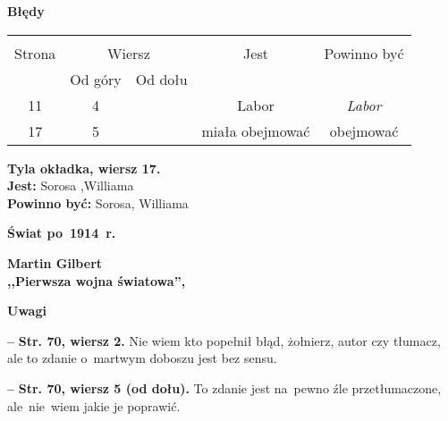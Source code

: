\documentclass[a4paper,11pt]{article}
\newcommand{\spaceTwo}{2em}
\newcommand{\spaceThree}{1em}
\newcommand{\spaceFour}{0.5em}
\newcommand{\tb}{\textbf}
\newcommand{\noi}{\noindent}
\newcommand{\start}{\noi \tb{--} {}}
\newcommand{\Center}[1]{\begin{center} #1 \end{center}}
\newcommand{\CenterTB}[1]{\Center{\tb{#1}}}
\newcommand{\StrWg}[2]{\tb{Str. #1, wiersz #2.}}
\newcommand{\StrWd}[2]{\tb{Str. #1, wiersz #2 (od dołu).}}
\newcommand{\Jest}{\tb{Jest: }}
\newcommand{\Pow}{\tb{Powinno być: }}
\newcommand{\Field}[1]{ \begin{center} {\LARGE \tb{#1} } \end{center} }
\newcommand{\Work}[1]{ \begin{center} {\large \tb{#1}} \end{center} }
\begin{document}
\CenterTB{Błędy}
\begin{center}
  \begin{tabular}{|c|c|c|c|c|}
    \hline
    & \multicolumn{2}{c|}{} & & \\
    Strona & \multicolumn{2}{c|}{Wiersz}& Jest & Powinno być \\ \cline{2-3}
    & Od góry & Od dołu &  &  \\ \hline
    11 & 4 & & Labor & \emph{Labor} \\
    17 & 5 & & miała obejmować & obejmować \\
    \hline
  \end{tabular}
\end{center}
\noi
\tb{Tyla okładka, wiersz 17.} \\
\Jest Sorosa ,Williama \\
\Pow Sorosa, Williama \\

\vspace{\spaceTwo}





\newpage
\Field{Świat po~1914~r.}

\vspace{\spaceTwo} \vspace{\spaceThree}



\Work{
  Martin Gilbert \\
  ,,Pierwsza wojna światowa'', \cite{GilbertPierwszaWojnaSwiatowa03} }


\CenterTB{Uwagi}

\start \StrWg{70}{2} Nie wiem kto popełnił błąd, żołnierz, autor czy
tłumacz, ale to zdanie o~martwym doboszu jest bez sensu.

\vspace{\spaceFour}


\start \StrWd{70}{5} To zdanie jest na~pewno źle przetłumaczone,
ale~nie~wiem jakie je poprawić.
\end{document}

